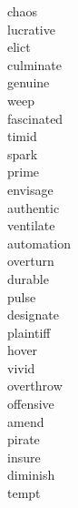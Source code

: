 \documentclass[a4paper, 10pt]{ctexart}
\begin{document}
\begin{multicols*}{2}
\begin{description}
\item[chaos]

\item[lucrative]

\item[elict]

\item[culminate]

\item[genuine]

\item[weep]

\item[fascinated]

\item[timid]

\item[spark]

\item[prime]

\item[envisage]

\item[authentic]

\item[ventilate]

\item[automation]

\item[overturn]

\item[durable]

\item[pulse]

\item[designate]

\item[plaintiff]

\item[hover]

\item[vivid]

\item[overthrow]

\item[offensive]

\item[amend]

\item[pirate]

\item[insure]

\item[diminish]

\item[tempt]


\end{description}
\end{multicols*}
\end{document}
